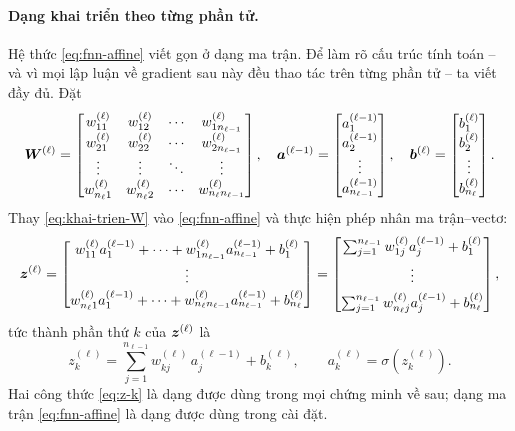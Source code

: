 \paragraph{Dạng khai triển theo từng phần tử.}
Hệ thức \eqref{eq:fnn-affine} viết gọn ở dạng ma trận. Để làm rõ cấu trúc tính
toán -- và vì mọi lập luận về gradient sau này đều thao tác trên từng phần tử --
ta viết đầy đủ. Đặt
\begin{equation}
\bm{W}^{(\ell)} =
\begin{bmatrix}
w^{(\ell)}_{11} & w^{(\ell)}_{12} & \cdots & w^{(\ell)}_{1n_{\ell-1}} \\
w^{(\ell)}_{21} & w^{(\ell)}_{22} & \cdots & w^{(\ell)}_{2n_{\ell-1}} \\
\vdots & \vdots & \ddots & \vdots \\
w^{(\ell)}_{n_\ell 1} & w^{(\ell)}_{n_\ell 2} & \cdots &
  w^{(\ell)}_{n_\ell n_{\ell-1}}
\end{bmatrix},
\quad
\bm{a}^{(\ell-1)} =
\begin{bmatrix} a^{(\ell-1)}_1 \\ a^{(\ell-1)}_2 \\ \vdots \\
  a^{(\ell-1)}_{n_{\ell-1}} \end{bmatrix},
\quad
\bm{b}^{(\ell)} =
\begin{bmatrix} b^{(\ell)}_1 \\ b^{(\ell)}_2 \\ \vdots \\
  b^{(\ell)}_{n_\ell} \end{bmatrix}.
\label{eq:khai-trien-W}
\end{equation}
Thay \eqref{eq:khai-trien-W} vào \eqref{eq:fnn-affine} và thực hiện phép nhân
ma trận--vectơ:
\begin{equation}
\bm{z}^{(\ell)}
=
\begin{bmatrix}
w^{(\ell)}_{11} a^{(\ell-1)}_1 + \cdots
  + w^{(\ell)}_{1n_{\ell-1}} a^{(\ell-1)}_{n_{\ell-1}} + b^{(\ell)}_1 \\[2pt]
\vdots \\[2pt]
w^{(\ell)}_{n_\ell 1} a^{(\ell-1)}_1 + \cdots
  + w^{(\ell)}_{n_\ell n_{\ell-1}} a^{(\ell-1)}_{n_{\ell-1}}
  + b^{(\ell)}_{n_\ell}
\end{bmatrix}
=
\begin{bmatrix}
\sum_{j=1}^{n_{\ell-1}} w^{(\ell)}_{1j} a^{(\ell-1)}_j + b^{(\ell)}_1 \\[4pt]
\vdots \\[4pt]
\sum_{j=1}^{n_{\ell-1}} w^{(\ell)}_{n_\ell j} a^{(\ell-1)}_j
  + b^{(\ell)}_{n_\ell}
\end{bmatrix},
\label{eq:z-thanh-phan}
\end{equation}
tức thành phần thứ $k$ của $\bm{z}^{(\ell)}$ là
\begin{equation}
z^{(\ell)}_k = \sum_{j=1}^{n_{\ell-1}} w^{(\ell)}_{kj}\, a^{(\ell-1)}_j
  + b^{(\ell)}_k,
\qquad
a^{(\ell)}_k = \sigma\!\left(z^{(\ell)}_k\right).
\label{eq:z-k}
\end{equation}
Hai công thức \eqref{eq:z-k} là dạng được dùng trong mọi chứng minh về sau; dạng
ma trận \eqref{eq:fnn-affine} là dạng được dùng trong cài đặt.
 
